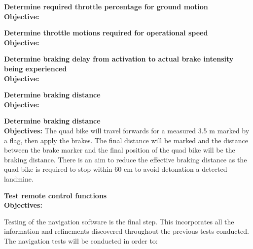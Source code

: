\documentclass[main.tex]{subfiles}
\begin{document}
\begin{appendices}
\begin{qb}
\textbf{Determine required throttle percentage for ground motion}\\
\textbf{Objective:} 

\end{qb}

\begin{qb}
\textbf{ Determine throttle motions required for operational speed}\\
\textbf{Objective:} 

\end{qb}
\begin{qb}
\textbf{Determine braking delay from activation to actual brake intensity being experienced}\\
\textbf{Objective:} 

\end{qb}
\begin{qb}
\textbf{Determine braking distance}\\
\textbf{Objective:} 

\end{qb}

\begin{qb}
\textbf{Determine braking distance}\\
\textbf{Objectives:} The quad bike will travel forwards for a measured 3.5 m marked by a flag, then apply the brakes. The final distance will be marked and the distance between the brake marker and the final position of the quad bike will be the braking distance. There is an aim to reduce the effective braking distance as the quad bike is required to stop within 60 cm to avoid detonation a detected landmine. 

\end{qb}
\begin{qb}
\textbf{Test remote control functions}\\
\textbf{Objectives:}
\end{qb}

\medskip\noindent 
Testing of the navigation software is the final step. This incorporates all the information and refinements discovered throughout the previous tests conducted. The navigation tests will be conducted in order to:


\end{appendices}
\end{document}

